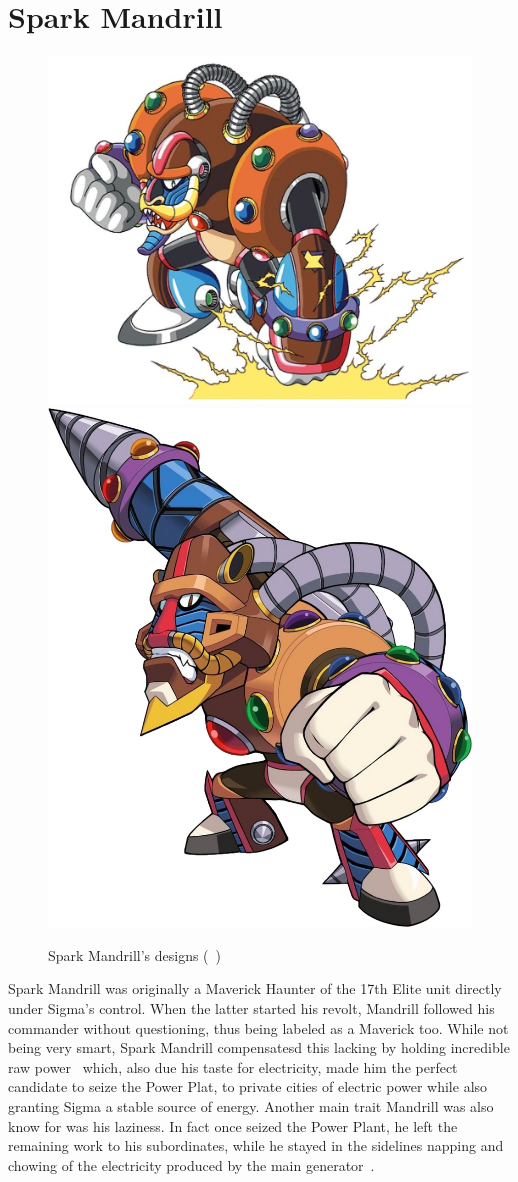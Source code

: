 \section{Spark Mandrill}\label{boss:Spark_mandrill}
\begin{figure}[htp]
	\centering
	\includegraphics[width=0.5\linewidth]{figures/X1/Spark_mandrill/SparkMandrill.jpg}
	\includegraphics[width=0.4\linewidth]{figures/X1/Spark_mandrill/MHXSparkMandrill.png}
	\caption{Spark Mandrill's designs (~\cite{book:MMX_Complete_art})}
\end{figure}
Spark Mandrill was originally a Maverick Haunter of the 17th Elite unit directly under Sigma's control. When the latter started his revolt, Mandrill followed his commander without questioning, thus being labeled as a Maverick too. While not being very smart, Spark Mandrill compensatesd this lacking by holding incredible raw power~\cite{MHX:manual} which, also due his taste for electricity, made him the perfect candidate to seize the Power Plat, to private cities of electric power while also granting Sigma a stable source of energy. Another main trait Mandrill was also know for was his laziness. In fact once seized the Power Plant, he left the remaining work to his subordinates, while he stayed in the sidelines napping and chowing of the electricity produced by the main generator~\cite{wayback:X_resources}.
